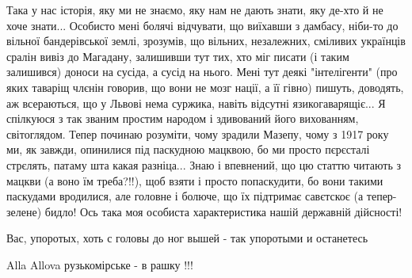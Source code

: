 \begin{itemize}

Така у нас історія, яку ми не знаємо, яку нам не дають знати, яку де-хто й не
хоче знати... Особисто мені болячі відчувати, що виїхавши з дамбасу, ніби-то до
вільної бандерівської землі, зрозумів, що вільних, незалежних, сміливих
українців сралін вивіз до Магадану, залишивши тут тих, хто міг писати (і таким
залишився) доноси на сусіда, а сусід на нього. Мені тут деякі "інтелігенти"
(про яких таваріщ члєнін говорив, що вони не мозг нації, а її гівно) пишуть,
доводять, аж всераються, що у Львові нема суржика, навіть відсутні
язикогаварящіє... Я спілкуюся з так званим простим народом і здивований його
вихованням, світоглядом. Тепер починаю розуміти, чому зрадили Мазепу, чому з
1917 року ми, як завжди, опинилися під паскудною мацквою, бо ми просто
пєрєсталі стрєлять, патаму шта какая разніца... Знаю і впевнений, що цю статтю
читають з мацкви (а воно їм треба?!!), щоб взяти і просто попаскудити, бо вони
такими паскудами вродилися, але головне і болюче, що їх підтримає савєтскоє (а
тепер- зелене) бидло! Ось така моя особиста характеристика нашій державній
дійсності!


Вас, упоротых, хоть с головы до ног вышей - так упоротыми и останетесь


Alla Allova рузькомірське - в рашку !!!

\end{itemize}
